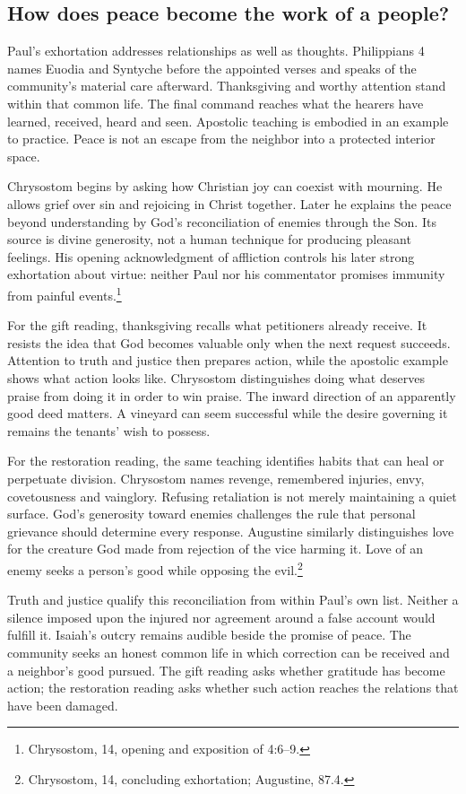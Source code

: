 \subsection{How does peace become the work of a people?}
Paul's exhortation addresses relationships as well as thoughts. Philippians 4 names Euodia and Syntyche before the appointed verses and speaks of the community's material care afterward. Thanksgiving and worthy attention stand within that common life. The final command reaches what the hearers have learned, received, heard and seen. Apostolic teaching is embodied in an example to practice. Peace is not an escape from the neighbor into a protected interior space.

Chrysostom begins by asking how Christian joy can coexist with mourning. He allows grief over sin and rejoicing in Christ together. Later he explains the peace beyond understanding by God's reconciliation of enemies through the Son. Its source is divine generosity, not a human technique for producing pleasant feelings. His opening acknowledgment of affliction controls his later strong exhortation about virtue: neither Paul nor his commentator promises immunity from painful events.\footnote{Chrysostom,  14, opening and exposition of 4:6--9.}

For the gift reading, thanksgiving recalls what petitioners already receive. It resists the idea that God becomes valuable only when the next request succeeds. Attention to truth and justice then prepares action, while the apostolic example shows what action looks like. Chrysostom distinguishes doing what deserves praise from doing it in order to win praise. The inward direction of an apparently good deed matters. A vineyard can seem successful while the desire governing it remains the tenants' wish to possess.

For the restoration reading, the same teaching identifies habits that can heal or perpetuate division. Chrysostom names revenge, remembered injuries, envy, covetousness and vainglory. Refusing retaliation is not merely maintaining a quiet surface. God's generosity toward enemies challenges the rule that personal grievance should determine every response. Augustine similarly distinguishes love for the creature God made from rejection of the vice harming it. Love of an enemy seeks a person's good while opposing the evil.\footnote{Chrysostom,  14, concluding exhortation; Augustine,  87.4.}

Truth and justice qualify this reconciliation from within Paul's own list. Neither a silence imposed upon the injured nor agreement around a false account would fulfill it. Isaiah's outcry remains audible beside the promise of peace. The community seeks an honest common life in which correction can be received and a neighbor's good pursued. The gift reading asks whether gratitude has become action; the restoration reading asks whether such action reaches the relations that have been damaged.

